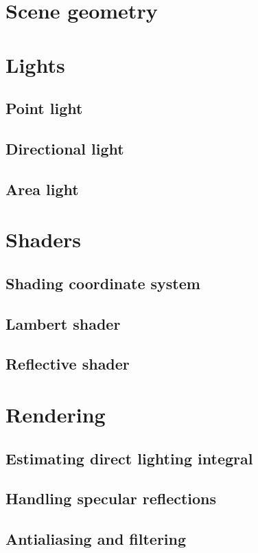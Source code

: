 \vfill
\section{Scene geometry}

\section{Lights}

\subsection{Point light}

\subsection{Directional light}

\subsection{Area light}

\section{Shaders}

\subsection{Shading coordinate system}

\subsection{Lambert shader}

\subsection{Reflective shader}

\section{Rendering}

\subsection{Estimating direct lighting integral}

\subsection{Handling specular reflections}

\subsection{Antialiasing and filtering}



